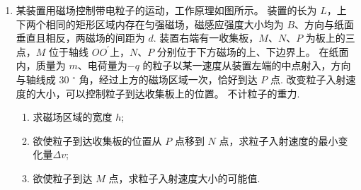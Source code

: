 \begin{enumerate}[leftmargin=0em]
\newpage
\item
{}
某装置用磁场控制带电粒子的运动，工作原理如图所示。 装置的长为 $ L $，上下两个相同的矩形区域内存在匀强磁场，磁感应强度大小均为 $ B $、方向与纸面垂直且相反，两磁场的间距为 $ d $. 装置右端有一收集板，$ M $、$ N $、$ P $ 为板上的三点，$ M $ 位于轴线 $ OO ^{\prime} $上，$ N $、$ P $ 分别位于下方磁场的上、下边界上。 在纸面内，质量为 $ m $、电荷量为$ -q $ 的粒子以某一速度从装置左端的中点射入，方向与轴线成 $ 30 $ $ ^{ \circ } $ 角，经过上方的磁场区域一次，恰好到达 $ P $ 点. 改变粒子入射速度的大小，可以控制粒子到达收集板上的位置。 不计粒子的重力.
\begin{enumerate}
\renewcommand{\labelenumi}{\arabic{enumi}.}
\item
求磁场区域的宽度 $ h $; 
\item 
欲使粒子到达收集板的位置从 $ P $ 点移到 $ N $ 点，求粒子入射速度的最小变化量$ \Delta v $;
\item 
欲使粒子到达 $ M $ 点，求粒子入射速度大小的可能值.



\end{enumerate}
\begin{figure}[h!]
\flushright

\end{figure}




\end{enumerate}
